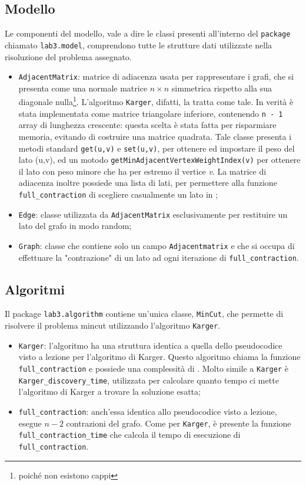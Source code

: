 \subsection{Modello}
Le componenti del modello, vale a dire le classi presenti all'interno del \texttt{package} chiamato \texttt{lab3.model}, comprendono tutte le strutture dati utilizzate nella risoluzione del problema assegnato. 
\begin{itemize}

	\item \label{adjmat}\texttt{AdjacentMatrix}: matrice di adiacenza usata per rappresentare i grafi, che si presenta come una normale matrice $n\times n$ simmetrica rispetto alla sua diagonale nulla\footnote{poiché non esistono cappi}. L'algoritmo \texttt{Karger}, difatti, la tratta come tale. In verità è stata implementata come matrice triangolare inferiore, contenendo \texttt{n - 1} array di lunghezza crescente: questa scelta è stata fatta per risparmiare memoria, evitando di costruire una matrice quadrata. Tale classe presenta i metodi standard \texttt{get(u,v)} e \texttt{set(u,v)}, per ottenere ed impostare il peso del lato (u,v), ed un motodo \texttt{getMinAdjacentVertexWeightIndex(v)} per ottenere il lato con peso minore che ha per estremo il vertice \textit{v}. La matrice di adiacenza inoltre possiede una lista di lati, per permettere alla funzione \texttt{full\_contraction} di scegliere casualmente un lato in ;

	\item \texttt{Edge}: classe utilizzata da \texttt{AdjacentMatrix} esclusivamente per restituire un lato del grafo in modo random;
	\item \texttt{Graph}: classe che contiene solo un campo \texttt{Adjacentmatrix} e che si occupa di effettuare la "contrazione" di un lato ad ogni iterazione di \texttt{full\_contraction}.
\end{itemize} 

\subsection{Algoritmi}
Il package \texttt{lab3.algorithm} contiene un'unica classe, \texttt{MinCut}, che permette di risolvere il problema mincut utilizzando l'algoritmo \texttt{Karger}.
\begin{itemize}
	\item \texttt{Karger}: l'algoritmo ha una struttura identica a quella dello pseudocodice visto a lezione per l'algoritmo di Karger. Questo algoritmo chiama la funzione \texttt{full\_contraction} e possiede una complessità di . Molto simile a \texttt{Karger} è \texttt{Karger\_discovery\_time}, utilizzata per calcolare quanto tempo ci mette l'algoritmo di Karger a trovare la soluzione esatta;
	\item \texttt{full\_contraction}: anch'essa identica allo pseudocodice visto a lezione, esegue $n-2$ contrazioni del grafo. Come per \texttt{Karger}, è presente la funzione \texttt{full\_contraction\_time} che calcola il tempo di esecuzione di \texttt{full\_contraction}.
\end{itemize}

